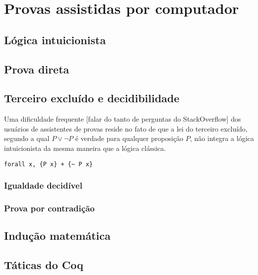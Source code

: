 \chapter{Provas assistidas por computador}
\label{cap:coq}

\section{Lógica intuicionista}

\section{Prova direta}

\section{Terceiro excluído e decidibilidade}

Uma dificuldade frequente [falar do tanto de perguntas do StackOverflow] dos usuários de assistentes de provas reside no fato de que a lei do terceiro excluído, segundo a qual $P \vee \neg P$ é verdade para qualquer proposição $P$, não integra a lógica intuicionista da mesma maneira que a lógica clássica.

\begin{verbatim}
forall x, {P x} + {~ P x}
\end{verbatim}

\subsection{Igualdade decidível}
\label{ssec:eq_decidivel}

\subsection{Prova por contradição}

\section{Indução matemática}

\section{Táticas do Coq}
